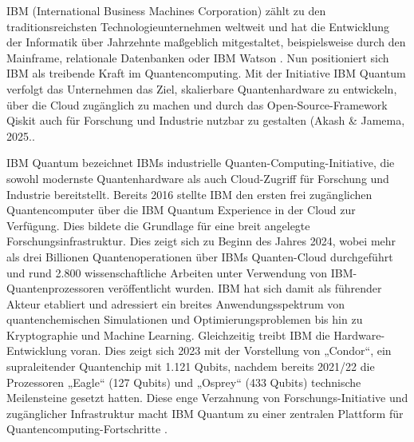 IBM (International Business Machines Corporation) zählt zu den traditionsreichsten Technologieunternehmen weltweit und hat die Entwicklung der Informatik über Jahrzehnte maßgeblich mitgestaltet, beispielsweise durch den Mainframe, relationale Datenbanken oder IBM Watson \cite{aruteQuantumSupremacyUsing2019a}. Nun positioniert sich IBM als treibende Kraft im Quantencomputing. Mit der Initiative IBM Quantum verfolgt das Unternehmen das Ziel, skalierbare Quantenhardware zu entwickeln, über die Cloud zugänglich zu machen und durch das Open-Source-Framework Qiskit auch für Forschung und Industrie nutzbar zu gestalten \cite{} (Akash & Jamema, 2025.\cite{miceliQuantumComputationVisualization2018}. 

IBM Quantum bezeichnet IBMs industrielle Quanten-Computing-Initiative, die sowohl modernste Quantenhardware als auch Cloud-Zugriff für Forschung und Industrie bereitstellt. Bereits 2016 stellte IBM den ersten frei zugänglichen Quantencomputer über die IBM Quantum Experience in der Cloud zur Verfügung. Dies bildete die Grundlage für eine breit angelegte Forschungsinfrastruktur. Dies zeigt sich zu Beginn des Jahres 2024, wobei mehr als drei Billionen Quantenoperationen über IBMs Quanten-Cloud durchgeführt und rund 2.800 wissenschaftliche Arbeiten unter Verwendung von IBM-Quantenprozessoren veröffentlicht wurden. IBM hat sich damit als führender Akteur etabliert und adressiert ein breites Anwendungsspektrum von quantenchemischen Simulationen und Optimierungsproblemen bis hin zu Kryptographie und Machine Learning. Gleichzeitig treibt IBM die Hardware-Entwicklung voran. Dies zeigt sich 2023 mit der Vorstellung von „Condor“, ein supraleitender Quantenchip mit 1.121 Qubits, nachdem bereits 2021/22 die Prozessoren „Eagle“ (127 Qubits) und „Osprey“ (433 Qubits) technische Meilensteine gesetzt hatten. Diese enge Verzahnung von Forschungs-Initiative und zugänglicher Infrastruktur macht IBM Quantum zu einer zentralen Plattform für Quantencomputing-Fortschritte \citealp[2]{abughanemIBMQuantumComputers2025}.

